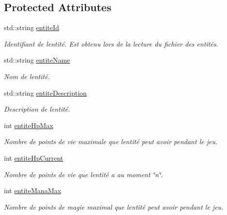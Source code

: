 \subsection*{Protected Attributes}
\begin{DoxyCompactItemize}
\item 
std\+::string \hyperlink{classentite_a904e8783de9fe2fc4306bf6b7822d025}{entite\+Id}
\begin{DoxyCompactList}\small\item\em Identifiant de l\textquotesingle{}entité. Est obtenu lors de la lecture du fichier des entités. \end{DoxyCompactList}\item 
std\+::string \hyperlink{classentite_abe631a515b1cd0866dcfb078c4ceb07a}{entite\+Name}
\begin{DoxyCompactList}\small\item\em Nom de l\textquotesingle{}entité. \end{DoxyCompactList}\item 
std\+::string \hyperlink{classentite_a6fab1d9a04ade2cb97ec0904b12c82c9}{entite\+Description}
\begin{DoxyCompactList}\small\item\em Description de l\textquotesingle{}entité. \end{DoxyCompactList}\item 
int \hyperlink{classentite_a754557f56c1c1fcbcbd40eec68b60f65}{entite\+Hp\+Max}
\begin{DoxyCompactList}\small\item\em Nombre de points de vie maximale que l\textquotesingle{}entité peut avoir pendant le jeu. \end{DoxyCompactList}\item 
int \hyperlink{classentite_a09661bc80d898530a760153f6b690070}{entite\+Hp\+Current}
\begin{DoxyCompactList}\small\item\em Nombre de points de vie que l\textquotesingle{}entité a au moment \char`\"{}n\char`\"{}. \end{DoxyCompactList}\item 
int \hyperlink{classentite_a696167d32c27b3b2a2fa6b473a888b18}{entite\+Mana\+Max}
\begin{DoxyCompactList}\small\item\em Nombre de points de magie maximal que l\textquotesingle{}entité peut avoir pendant le jeu. \end{DoxyCompactList}\item 

\end{DoxyCompactItemize}
